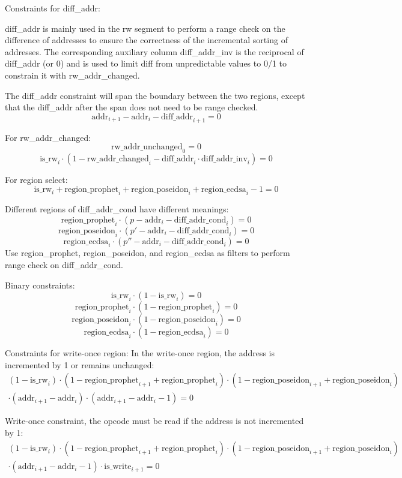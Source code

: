 Constraints for diff\_addr:

diff\_addr is mainly used in the rw segment to perform a range check on the difference of addresses to ensure the correctness of the incremental sorting of addresses. The corresponding auxiliary
column diff\_addr\_inv is the reciprocal of diff\_addr (or 0) and is used to limit diff from unpredictable values to 0/1 to constrain it with rw\_addr\_changed.

The diff\_addr constraint will span the boundary between the two regions, except that the diff\_addr after the span does not need to be range checked.
\[ \mathrm{addr}_{i+1} - \mathrm{addr}_i - \mathrm{diff\_addr}_{i+1} = 0 \]

For rw\_addr\_changed:
\[ \mathrm{rw\_addr\_unchanged}_0 = 0 \]
\[ \mathrm{is\_rw}_i \cdot (1 - \mathrm{rw\_addr\_changed}_i - \mathrm{diff\_addr}_i \cdot \mathrm{diff\_addr\_inv}_i) = 0 \]

For region select:
\[ \mathrm{is\_rw}_i + \mathrm{region\_prophet}_i + \mathrm{region\_poseidon}_i + \mathrm{region\_ecdsa}_i - 1 = 0 \]

Different regions of diff\_addr\_cond have different meanings:
\[ \mathrm{region\_prophet}_i \cdot (p - \mathrm{addr}_i - \mathrm{diff\_addr\_cond}_i) = 0 \]
\[ \mathrm{region\_poseidon}_i \cdot (p'- \mathrm{addr}_i - \mathrm{diff\_addr\_cond}_i) = 0 \]
\[ \mathrm{region\_ecdsa}_i \cdot (p'' - \mathrm{addr}_i - \mathrm{diff\_addr\_cond}_i) = 0 \]
Use region\_prophet, region\_poseidon, and region\_ecdsa as filters to perform range check on diff\_addr\_cond.

Binary constraints:
\[ \mathrm{is\_rw}_i \cdot (1 - \mathrm{is\_rw}_i) = 0 \]
\[ \mathrm{region\_prophet}_i \cdot (1 - \mathrm{region\_prophet}_i) = 0 \]
\[ \mathrm{region\_poseidon}_i \cdot (1 - \mathrm{region\_poseidon}_i)=0 \]
\[ \mathrm{region\_ecdsa}_i \cdot (1 - \mathrm{region\_ecdsa}_i)= 0 \]

Constraints for write-once region:
In the write-once region, the address is incremented by 1 or remains unchanged:
\begin{multline*}
    (1-\mathrm{is\_rw}_i) \cdot (1-\mathrm{region\_prophet}_{i+1}+\mathrm{region\_prophet}_i) \cdot (1-\mathrm{region\_poseidon}_{i+1}+\mathrm{region\_poseidon}_i) \\
    \cdot (\mathrm{addr}_{i+1}-\mathrm{addr}_i) \cdot (\mathrm{addr}_{i+1}-\mathrm{addr}_i-1)=0
\end{multline*}

Write-once constraint, the opcode must be read if the address is not incremented by 1:
\begin{multline*}
    (1-\mathrm{is\_rw}_i) \cdot (1-\mathrm{region\_prophet}_{i+1}+\mathrm{region\_prophet}_i) \cdot (1-\mathrm{region\_poseidon}_{i+1}+\mathrm{region\_poseidon}_i) \\
    \cdot (\mathrm{addr}_{i+1}-\mathrm{addr}_i-1) \cdot \mathrm{is\_write}_{i+1}=0
\end{multline*}


